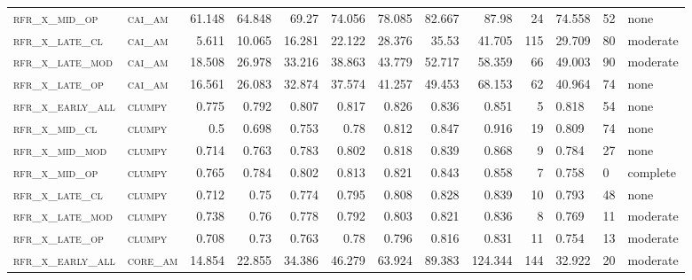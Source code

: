 \begin{landscape}
\begin{center}
\begin{footnotesize}
\begin{longtable}{llrrrrr|rrr}
\textsc{rfr\_x\_mid\_op   } & \textsc{cai\_am   }   & 61.148  & 64.848  & 69.27   & 74.056   & 78.085   & 82.667   & 87.98    & 24     & 74.558        & 52            & none        \\
\textsc{rfr\_x\_late\_cl  } & \textsc{cai\_am   }   & 5.611   & 10.065  & 16.281  & 22.122   & 28.376   & 35.53    & 41.705   & 115    & 29.709        & 80            & moderate        \\
\textsc{rfr\_x\_late\_mod } & \textsc{cai\_am   }   & 18.508  & 26.978  & 33.216  & 38.863   & 43.779   & 52.717   & 58.359   & 66     & 49.003        & 90            & moderate        \\
\textsc{rfr\_x\_late\_op  } & \textsc{cai\_am   }   & 16.561  & 26.083  & 32.874  & 37.574   & 41.257   & 49.453   & 68.153   & 62     & 40.964        & 74            & none        \\
\textsc{rfr\_x\_early\_all} & \textsc{clumpy    }   & 0.775   & 0.792   & 0.807   & 0.817    & 0.826    & 0.836    & 0.851    & 5      & 0.818         & 54            & none        \\
\textsc{rfr\_x\_mid\_cl   } & \textsc{clumpy    }   & 0.5     & 0.698   & 0.753   & 0.78     & 0.812    & 0.847    & 0.916    & 19     & 0.809         & 74            & none        \\
\textsc{rfr\_x\_mid\_mod  } & \textsc{clumpy    }   & 0.714   & 0.763   & 0.783   & 0.802    & 0.818    & 0.839    & 0.868    & 9      & 0.784         & 27            & none        \\
\textsc{rfr\_x\_mid\_op   } & \textsc{clumpy    }   & 0.765   & 0.784   & 0.802   & 0.813    & 0.821    & 0.843    & 0.858    & 7      & 0.758         & 0             & complete            \\
\textsc{rfr\_x\_late\_cl  } & \textsc{clumpy    }   & 0.712   & 0.75    & 0.774   & 0.795    & 0.808    & 0.828    & 0.839    & 10     & 0.793         & 48            & none        \\
\textsc{rfr\_x\_late\_mod } & \textsc{clumpy    }   & 0.738   & 0.76    & 0.778   & 0.792    & 0.803    & 0.821    & 0.836    & 8      & 0.769         & 11            & moderate        \\
\textsc{rfr\_x\_late\_op  } & \textsc{clumpy    }   & 0.708   & 0.73    & 0.763   & 0.78     & 0.796    & 0.816    & 0.831    & 11     & 0.754         & 13            & moderate        \\
\textsc{rfr\_x\_early\_all} & \textsc{core\_am  }   & 14.854  & 22.855  & 34.386  & 46.279   & 63.924   & 89.383   & 124.344  & 144    & 32.922        & 20            & moderate        \\

\end{longtable}
\end{footnotesize}
\end{center}
\end{landscape}
